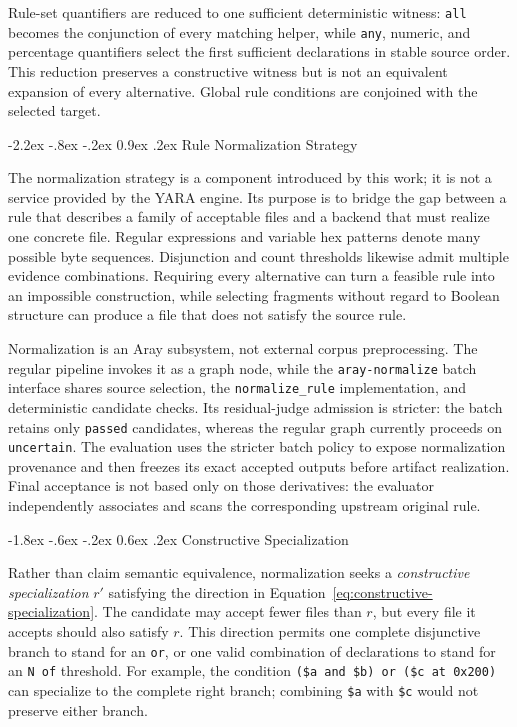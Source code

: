 \documentclass[11pt,twocolumn]{article}
\makeatletter
\newcommand{\code}[1]{\texttt{#1}}
\renewcommand\section{\@startsection{section}{1}{\z@}%
  {-2.2ex \@plus -.8ex \@minus -.2ex}%
  {0.9ex \@plus .2ex}%
  {\normalfont\large\bfseries}}
\renewcommand\subsection{\@startsection{subsection}{2}{\z@}%
  {-1.8ex \@plus -.6ex \@minus -.2ex}%
  {0.6ex \@plus .2ex}%
  {\normalfont\normalsize\bfseries}}
\makeatother
\begin{document}
Rule-set quantifiers are reduced to one sufficient deterministic witness:
\code{all} becomes the conjunction of every matching helper, while \code{any},
numeric, and percentage quantifiers select the first sufficient declarations in
stable source order. This reduction preserves a constructive witness but is not
an equivalent expansion of every alternative. Global rule conditions are
conjoined with the selected target.

\section{Rule Normalization Strategy}
\label{sec:normalization}

The normalization strategy is a component introduced by this work; it is not a
service provided by the YARA engine. Its purpose is to bridge the gap between a
rule that describes a family of acceptable files and a backend that must realize
one concrete file. Regular expressions and variable hex patterns denote many
possible byte sequences. Disjunction and count thresholds likewise admit
multiple evidence combinations. Requiring every alternative can turn a feasible
rule into an impossible construction, while selecting fragments without regard
to Boolean structure can produce a file that does not satisfy the source rule.

Normalization is an Aray subsystem, not external corpus preprocessing. The
regular pipeline invokes it as a graph node, while the \code{aray-normalize}
batch interface shares source selection, the \code{normalize\_rule}
implementation, and deterministic candidate checks. Its residual-judge admission
is stricter: the batch retains only \code{passed} candidates, whereas the regular
graph currently proceeds on \code{uncertain}. The evaluation uses the stricter
batch policy to expose normalization provenance and then freezes its exact
accepted outputs before artifact realization. Final acceptance is not based only
on those derivatives: the evaluator independently associates and scans the
corresponding upstream original rule.

\subsection{Constructive Specialization}

Rather than claim semantic equivalence, normalization seeks a
\emph{constructive specialization} $r'$ satisfying the direction in
Equation~\ref{eq:constructive-specialization}. The candidate may accept fewer
files than $r$, but every file it accepts should also satisfy $r$. This direction
permits one complete disjunctive branch to stand for an \code{or}, or one valid
combination of declarations to stand for an \code{N of} threshold. For example,
the condition \code{(\$a and \$b) or (\$c at 0x200)} can specialize to the
complete right branch; combining \code{\$a} with \code{\$c} would not preserve
either branch.
\end{document}
